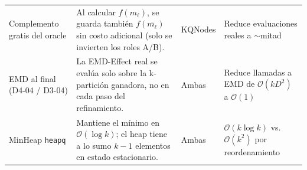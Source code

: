 \begin{table}[H]
\begin{tabular}{p{3.2cm} p{4.5cm} p{2.5cm} p{3cm}}
    Complemento gratis del oracle
      & Al calcular $f(m_\ell)$, se guarda también $f(\overline{m_\ell})$ sin costo
        adicional (solo se invierten los roles A/B).
      & KQNodes
      & Reduce evaluaciones reales a $\sim$mitad \\[4pt]

    EMD al final (D4-04 / D3-04)
      & La EMD-Effect real se evalúa solo sobre la k-partición ganadora, no en
        cada paso del refinamiento.
      & Ambas
      & Reduce llamadas a EMD de $\mathcal{O}(kD^2)$ a $\mathcal{O}(1)$ \\[4pt]

    MinHeap \texttt{heapq}
      & Mantiene el mínimo en $\mathcal{O}(\log k)$; el heap tiene a lo sumo
        $k-1$ elementos en estado estacionario.
      & Ambas
      & $\mathcal{O}(k \log k)$ vs. $\mathcal{O}(k^2)$ por reordenamiento \\
    \bottomrule
  \end{tabular}
\end{table}
